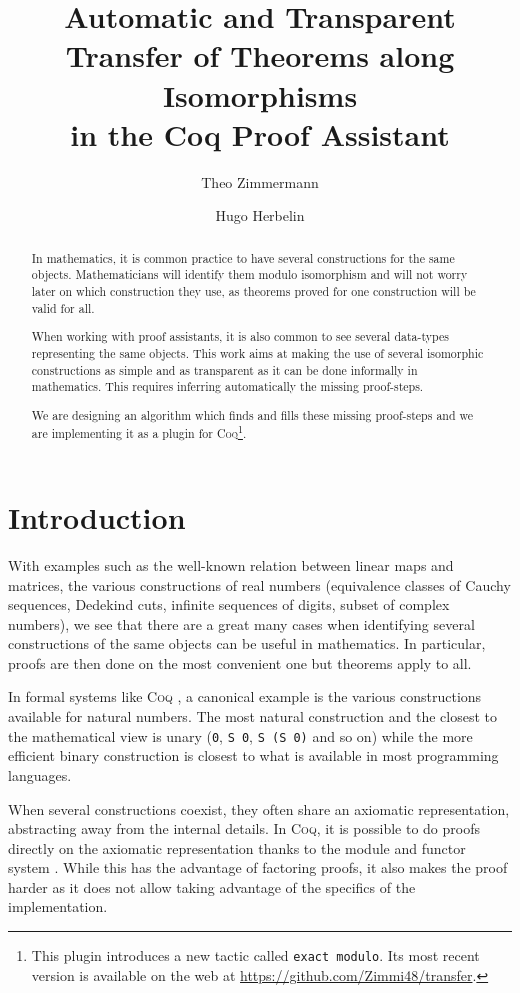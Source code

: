 \documentclass{llncs}
\title{Automatic and Transparent Transfer of Theorems along Isomorphisms \\
in the {\sc Coq} Proof Assistant}
\author{Theo Zimmermann\inst{1} \and Hugo Herbelin\inst{2}}
\institute{\'Ecole Normale Sup\'erieure, Paris, France \\ \email{theo.zimmermann@ens.fr}
\and Inria Paris-Rocquencourt, Paris, France \\ \email{hugo.herbelin@inria.fr}}
\begin{document}
\maketitle

\begin{abstract}
In mathematics, it is common practice to have several constructions
for the same objects.
Mathematicians will identify them modulo isomorphism and will
not worry later on which construction they use, as theorems proved
for one construction
will be valid for all.

When working with proof assistants, it is also common to see several
data-types representing the same objects.
This work aims at making the use of several isomorphic constructions
as simple and as transparent as it can be done informally in
mathematics.
This requires inferring automatically the missing proof-steps.

We are designing an algorithm which finds and fills these missing
proof-steps and we are implementing it as a plugin for \textsc{Coq}\footnote{
This plugin introduces a new tactic called \texttt{exact modulo}.
Its most recent version is available on the web at
\url{https://github.com/Zimmi48/transfer}.}.
\end{abstract}

\section{Introduction}

With examples such as the well-known relation between
linear maps and matrices, the various constructions of real numbers
(equivalence classes of Cauchy sequences, Dedekind cuts,
infinite sequences of digits, subset of complex numbers), we see that
there are a great many cases when identifying several constructions
of the same objects can be useful in mathematics. In particular, proofs
are then done on the most convenient one but theorems apply to all.

In formal systems like \textsc{Coq} \cite{Coq:manual}, a canonical
example is the various constructions available for natural numbers.
The most natural construction and the closest to the mathematical view
is unary (\texttt{0}, \texttt{S 0}, \texttt{S (S 0)} and so on) while
the more efficient binary construction is closest to what is available
in most programming languages.

When several constructions coexist, they often share an axiomatic
representation, abstracting away from the internal details.
In \textsc{Coq}, it is possible to do proofs directly on the
axiomatic representation thanks to the module and functor system 
\cite{chrzkaszcz2003implementing}.
While this has the advantage of
factoring proofs, it also makes the proof harder as it does not allow taking
advantage of the specifics of the implementation.
\end{document}
